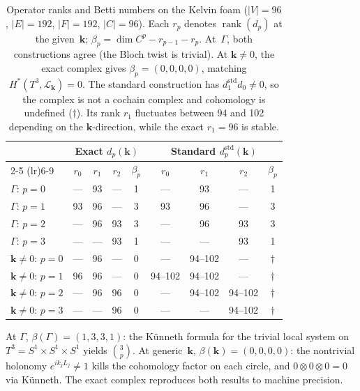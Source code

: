 \documentclass[preprint,12pt]{elsarticle}
\begin{document}
\begin{table}[h]
\centering
\begin{tabular}{lcccccccc}
\toprule
& \multicolumn{4}{c}{Exact $d_p(\mathbf{k})$} & \multicolumn{4}{c}{Standard $d_p^{\mathrm{std}}(\mathbf{k})$} \\
\cmidrule(lr){2-5} \cmidrule(lr){6-9}
& $r_0$ & $r_1$ & $r_2$ & $\beta_p$ & $r_0$ & $r_1$ & $r_2$ & $\beta_p$ \\
\midrule
$\Gamma$: $p{=}0$ & ---   & 93  & --- & 1 & ---   & 93  & --- & 1 \\
$\Gamma$: $p{=}1$ & 93  & 96  & --- & 3 & 93  & 96  & --- & 3 \\
$\Gamma$: $p{=}2$ & --- & 96  & 93  & 3 & --- & 96  & 93  & 3 \\
$\Gamma$: $p{=}3$ & --- & ---   & 93  & 1 & --- & ---   & 93  & 1 \\
\midrule
$\mathbf{k}{\neq}0$: $p{=}0$ & ---   & 96  & --- & 0 & ---   & 94--102 & --- & $\dagger$ \\
$\mathbf{k}{\neq}0$: $p{=}1$ & 96  & 96  & --- & 0 & 94--102  & 94--102 & --- & $\dagger$ \\
$\mathbf{k}{\neq}0$: $p{=}2$ & --- & 96  & 96  & 0 & --- & 94--102  & 94--102 & $\dagger$ \\
$\mathbf{k}{\neq}0$: $p{=}3$ & --- & ---   & 96  & 0 & --- & ---   & 94--102 & $\dagger$ \\
\bottomrule
\end{tabular}
\caption{Operator ranks and Betti numbers on the Kelvin foam ($|V|{=}96$, $|E|{=}192$, $|F|{=}192$, $|C|{=}96$). Each $r_p$ denotes $\operatorname{rank}(d_p)$ at the given~$\mathbf{k}$; $\beta_p = \dim C^p - r_{p-1} - r_p$. At~$\Gamma$, both constructions agree (the Bloch twist is trivial). At $\mathbf{k}{\neq}0$, the exact complex gives $\beta_p = (0,0,0,0)$, matching $H^*(T^3, \mathcal{L}_\mathbf{k}) = 0$. The standard construction has $d_1^{\mathrm{std}}d_0 \neq 0$, so the complex is not a cochain complex and cohomology is undefined ($\dagger$). Its rank $r_1$ fluctuates between 94 and 102 depending on the $\mathbf{k}$-direction, while the exact $r_1 = 96$ is stable.}
\label{tab:cohomology}
\end{table}

At $\Gamma$, $\beta(\Gamma) = (1,3,3,1)$: the K\"unneth formula for the trivial local system on $T^3 = S^1 \times S^1 \times S^1$ yields $\binom{3}{p}$. At generic~$\mathbf{k}$, $\beta(\mathbf{k}) = (0,0,0,0)$: the nontrivial holonomy $e^{ik_jL_j} \neq 1$ kills the cohomology factor on each circle, and $0 \otimes 0 \otimes 0 = 0$ via K\"unneth. The exact complex reproduces both results to machine precision.
\end{document}
